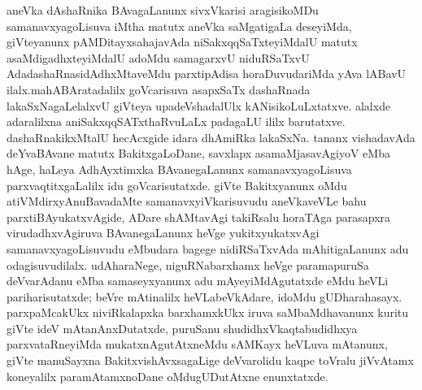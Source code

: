 aneVka dAshaRnika BAvagaLanunx sivxVkarisi aragisikoMDu samanavxyagoLisuva iMtha matutx aneVka saMgatigaLa deseyiMda, giVteyanunx pAMDitayxsahajavAda niSakxqqSaTxte\break\-yiMdalU matutx asaMdigadhxteyiMdalU adoMdu samagarxvU niduRSaTxvU Ada\break dashaRna\-sidAdhxMtaveMdu parxtipAdisa horaDuvudariMda yAva lABavU ilalx.\break mahABAratadalilx goVcarisuva asapxSaTx dashaRnada lakaSxNagaLelalxvU giVteya upadeVsha\-dalUlx kANisikoLuLxtatxve. alalxde adaralilxna aniSakxqqSATxthaRvuLaLx padagaLU ililx barutatxve. dashaRnakikxMtalU hecAcxgide idara dhAmiRka lakaSxNa. tananx vishadavAda deYvaBAvane matutx BakitxgaLoDane, savxlapx asamaMjasavAgiyoV eMba hAge, haLeya AdhAyxtimxka BAvanegaLanunx samanavxyagoLisuva parxvaqtitxgaLalilx idu goVcarisutatxde. giVte Bakitxyanunx oMdu atiVMdirxyAnuBavadaMte samanavxyiVkarisuvudu aneVkaveVLe bahu parxtiBAyukatxvAgide, ADare shAMtavAgi takiRsalu horaTAga parasapxra virudadhxvAgiruva BAvanegaLanunx heVge yukitxyukatxvAgi samanavxyagoLisuvudu eMbudara bagege nidiRSaTxvAda mAhitigaLanunx adu odagisuvudilalx. udAharaNege, niguRNabarxhamx heVge paramapuruSa deVvarAdanu eMba samaseyxyanunx adu mAyeyiMdAgutatxde eMdu heVLi pariharisutatxde; beVre mAtinalilx heVLabeVkAdare, idoMdu gUDharahasayx. parxpaMcakUkx niviRkalapxka barxhamxkUkx iruva saMbaMdhavanunx kuritu giVte ideV mAtanAnxDutatxde, puruSanu shudidhxVkaqtabudidhxya parxvataRneyiMda mukatxnAgutAtxneMdu sAMKayx heVLuva mAtanunx, giVte manuSayxna BakitxvishAvxsagaLige deVvarolidu kaqpe toVralu jiVvAtamx koneyalilx paramAtamxnoDane oMdugUDutAtxne enunxtatxde. 

